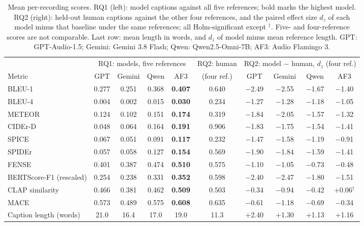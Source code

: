 \documentclass{article}
\newcommand{\gpt}{GPT-Audio-1.5}
\newcommand{\gem}{Gemini 3.8 Flash}
\newcommand{\qwen}{Qwen2.5-Omni-7B}
\newcommand{\af}{Audio Flamingo 3}
\begin{document}
\begin{table}[t]
\centering
\caption{Mean per-recording scores. RQ1 (left): model captions against all five references; bold marks the highest
model. RQ2 (right): held-out human captions against the other four references, and the paired effect size $d_z$ of
each model minus that baseline under the same references; all Holm-significant except $^\dagger$. Five- and
four-reference scores are not comparable. Last row: mean length in words, and $d_z$ of model minus mean reference length. GPT:
\gpt; Gemini: \gem; Qwen: \qwen; AF3: \af.}
\label{tab:scores}
\small
\begin{tabular}{lcccc@{\hspace{1.2em}}c@{\hspace{1.2em}}cccc}
\toprule
 & \multicolumn{4}{c}{RQ1: models, five references} & RQ2: human & \multicolumn{4}{c}{RQ2: model $-$ human, $d_z$ (four ref.)} \\
\cmidrule(lr){2-5}\cmidrule(lr){6-6}\cmidrule(lr){7-10}
Metric & GPT & Gemini & Qwen & AF3 & (four ref.) & GPT & Gemini & Qwen & AF3 \\
\midrule
BLEU-1 & 0.277 & 0.251 & 0.368 & \textbf{0.407} & 0.640 & $-$2.49 & $-$2.55 & $-$1.67 & $-$1.40 \\
BLEU-4 & 0.004 & 0.002 & 0.015 & \textbf{0.030} & 0.234 & $-$1.27 & $-$1.28 & $-$1.18 & $-$1.05 \\
METEOR & 0.124 & 0.102 & 0.151 & \textbf{0.174} & 0.319 & $-$1.84 & $-$2.05 & $-$1.57 & $-$1.32 \\
CIDEr-D & 0.048 & 0.064 & 0.164 & \textbf{0.191} & 0.906 & $-$1.83 & $-$1.75 & $-$1.54 & $-$1.41 \\
SPICE & 0.067 & 0.051 & 0.091 & \textbf{0.117} & 0.232 & $-$1.47 & $-$1.58 & $-$1.19 & $-$0.91 \\
SPIDEr & 0.057 & 0.058 & 0.127 & \textbf{0.154} & 0.569 & $-$1.90 & $-$1.84 & $-$1.59 & $-$1.41 \\
FENSE & 0.401 & 0.387 & 0.474 & \textbf{0.510} & 0.575 & $-$1.10 & $-$1.05 & $-$0.73 & $-$0.48 \\
BERTScore-F1 (rescaled) & 0.254 & 0.238 & 0.331 & \textbf{0.352} & 0.598 & $-$2.40 & $-$2.47 & $-$1.80 & $-$1.51 \\
\midrule
CLAP similarity & 0.466 & 0.381 & 0.462 & \textbf{0.509} & 0.503 & $-$0.34 & $-$0.94 & $-$0.42 & $+$0.06$^\dagger$ \\
MACE & 0.573 & 0.489 & 0.575 & \textbf{0.608} & 0.635 & $-$0.61 & $-$1.18 & $-$0.69 & $-$0.34 \\
\midrule
Caption length (words) & 21.0 & 16.4 & 17.0 & 19.0 & 11.3 & $+$2.40 & $+$1.30 & $+$1.13 & $+$1.16 \\
\bottomrule
\end{tabular}
\end{table}
\end{document}
